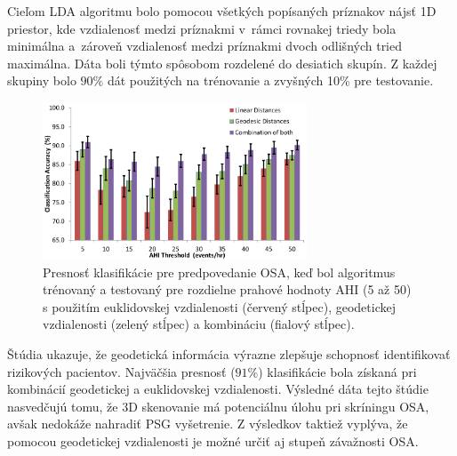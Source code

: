 Cieľom LDA algoritmu bolo pomocou všetkých popísaných príznakov nájsť 1D priestor, kde vzdialenosť medzi príznakmi v rámci rovnakej triedy bola minimálna a zároveň vzdialenosť medzi príznakmi dvoch odlišných tried maximálna. Dáta boli týmto spôsobom rozdelené do desiatich skupín. Z každej skupiny bolo $ 90\% $ dát použitých na trénovanie a zvyšných 10\% pre testovanie. 

\begin{figure}[h]
	\centering
	\includegraphics[width=0.7\textwidth]{figures/resers_l.png}
	\caption{Presnosť klasifikácie pre predpovedanie OSA, keď bol algoritmus trénovaný a testovaný pre rozdielne prahové hodnoty AHI (5 až 50) s použitím euklidovskej vzdialenosti (červený stĺpec), geodetickej vzdialenosti (zelený stĺpec) a kombináciu (fialový stĺpec). }
	\label{fig:resers:l}
\end{figure}

Štúdia ukazuje, že geodetická informácia výrazne zlepšuje schopnosť identifikovať rizikových pacientov. Najväčšia presnosť ($ 91\% $) klasifikácie bola získaná pri kombinácií geodetickej a euklidovskej vzdialenosti. Výsledné dáta tejto štúdie nasvedčujú tomu, že 3D skenovanie má potenciálnu úlohu pri skríningu OSA, avšak nedokáže nahradiť PSG vyšetrenie. Z výsledkov taktiež vyplýva, že pomocou geodetickej vzdialenosti je možné určiť aj stupeň závažnosti OSA.
